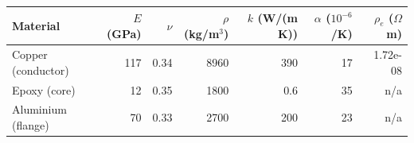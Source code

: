 \begin{tabular}{lrrrrrr}
\toprule
Material & $E$ (GPa) & $\nu$ & $\rho$ (kg/m$^3$) & $k$ (W/(m K)) & $\alpha$ ($10^{-6}$/K) & $\rho_e$ ($\Omega$ m) \\
\midrule
Copper (conductor) & 117 & 0.34 & 8960 & 390 & 17 & 1.72e-08 \\
Epoxy (core) & 12 & 0.35 & 1800 & 0.6 & 35 & n/a \\
Aluminium (flange) & 70 & 0.33 & 2700 & 200 & 23 & n/a \\
\bottomrule
\end{tabular}
